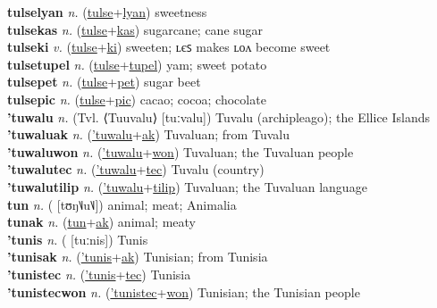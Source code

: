 \textbf{tulselyan} \textit{n.} (\hyperref[tulse]{tulse}+\hyperref[lyan]{lyan})
sweetness \label{tulselyan} \\
\textbf{tulsekas} \textit{n.} (\hyperref[tulse]{tulse}+\hyperref[kas]{kas})
sugarcane; cane sugar \label{tulsekas} \\
\textbf{tulseki} \textit{v.} (\hyperref[tulse]{tulse}+\hyperref[ki]{ki})
sweeten; ʟєꜱ makes ʟᴏᴧ become sweet \label{tulseki} \\
\textbf{tulsetupel} \textit{n.} (\hyperref[tulse]{tulse}+\hyperref[tupel]{tupel})
yam; sweet potato \label{tulsetupel} \\
\textbf{tulsepet} \textit{n.} (\hyperref[tulse]{tulse}+\hyperref[pet]{pet})
sugar beet \label{tulsepet} \\
\textbf{tulsepic} \textit{n.} (\hyperref[tulse]{tulse}+\hyperref[pic]{pic})
cacao; cocoa; chocolate \label{tulsepic} \\
\textbf{'tuwalu} \textit{n.} (Tvl. ⟨Tuuvalu⟩ [tuːvalu])
Tuvalu (archipleago); the Ellice Islands \label{'tuwalu} \\
\textbf{'tuwaluak} \textit{n.} (\hyperref['tuwalu]{'tuwalu}+\hyperref[ak]{ak})
Tuvaluan; from Tuvalu \label{'tuwaluak} \\
\textbf{'tuwaluwon} \textit{n.} (\hyperref['tuwalu]{'tuwalu}+\hyperref[won]{won})
Tuvaluan; the Tuvaluan people \label{'tuwaluwon} \\
\textbf{'tuwalutec} \textit{n.} (\hyperref['tuwalu]{'tuwalu}+\hyperref[tec]{tec})
Tuvalu (country) \label{'tuwalutec} \\
\textbf{'tuwalutilip} \textit{n.} (\hyperref['tuwalu]{'tuwalu}+\hyperref[tilip]{tilip})
Tuvaluan; the Tuvaluan language \label{'tuwalutilip} \\
\textbf{tun} \textit{n.} ( [tʊŋ˥˩u˥˩])
animal; meat; Animalia \label{tun} \\
\textbf{tunak} \textit{n.} (\hyperref[tun]{tun}+\hyperref[ak]{ak})
animal; meaty \label{tunak} \\
\textbf{'tunis} \textit{n.} ( [tuːnis])
Tunis \label{'tunis} \\
\textbf{'tunisak} \textit{n.} (\hyperref['tunis]{'tunis}+\hyperref[ak]{ak})
Tunisian; from Tunisia \label{'tunisak} \\
\textbf{'tunistec} \textit{n.} (\hyperref['tunis]{'tunis}+\hyperref[tec]{tec})
Tunisia \label{'tunistec} \\
\textbf{'tunistecwon} \textit{n.} (\hyperref['tunistec]{'tunistec}+\hyperref[won]{won})
Tunisian; the Tunisian people \label{'tunistecwon} \\
